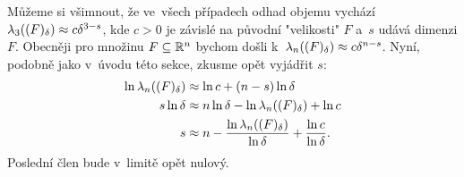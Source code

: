 Můžeme si všimnout, že ve~všech případech odhad objemu vychází $\lambda_3((F)_\delta)\approx c\delta^{3-s}$, kde $c>0$ je závislé na původní "velikosti" $F$ a~$s$ udává dimenzi $F$. Obecněji pro množinu $F\subseteq\mathbb{R}^n$ bychom došli k~$\lambda_n((F)_\delta)\approx c\delta^{n-s}$. Nyní, podobně jako v~úvodu této sekce, zkusme opět vyjádřit $s$:
\begin{align*}
    \ln{\ensuremath{\lambda_n}((F)_\delta)}&\approx\ln{c}+(n-s)\ln{\delta}\\
    s\ln{\delta}&\approx n\ln{\delta}-\ln{\ensuremath{\lambda_n}((F)_\delta)}+\ln{c}\\
    s&\approx n-\dfrac{\ln{\ensuremath{\lambda_n}((F)_\delta)}}{\ln{\delta}}+\dfrac{\ln{c}}{\ln{\delta}}.
\end{align*}
Poslední člen bude v~limitě opět nulový.

